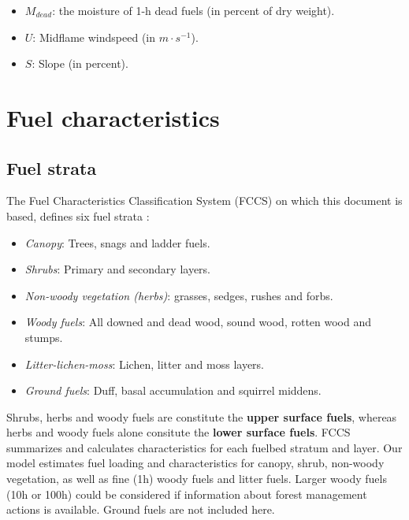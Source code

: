 \documentclass[]{book}
\providecommand{\tightlist}{%
  \setlength{\itemsep}{0pt}\setlength{\parskip}{0pt}}
\begin{document}
\begin{itemize}
\tightlist
\item
  \(M_{dead}\): the moisture of 1-h dead fuels (in percent of dry weight).
\item
  \(U\): Midflame windspeed (in \(m\cdot s^{-1}\)).
\item
  \(S\): Slope (in percent).
\end{itemize}

\hypertarget{fuel-characteristics}{%
\section{Fuel characteristics}\label{fuel-characteristics}}

\hypertarget{fuel-strata}{%
\subsection{Fuel strata}\label{fuel-strata}}

The Fuel Characteristics Classification System (FCCS) on which this document is based, defines six fuel strata \citep{Prichard2013}:

\begin{itemize}
\tightlist
\item
  \emph{Canopy}: Trees, snags and ladder fuels.
\item
  \emph{Shrubs}: Primary and secondary layers.
\item
  \emph{Non-woody vegetation (herbs)}: grasses, sedges, rushes and forbs.
\item
  \emph{Woody fuels}: All downed and dead wood, sound wood, rotten wood and stumps.
\item
  \emph{Litter-lichen-moss}: Lichen, litter and moss layers.
\item
  \emph{Ground fuels}: Duff, basal accumulation and squirrel middens.
\end{itemize}

Shrubs, herbs and woody fuels are constitute the \textbf{upper surface fuels}, whereas herbs and woody fuels alone consitute the \textbf{lower surface fuels}. FCCS summarizes and calculates characteristics for each fuelbed stratum and layer. Our model estimates fuel loading and characteristics for canopy, shrub, non-woody vegetation, as well as fine (1h) woody fuels and litter fuels. Larger woody fuels (10h or 100h) could be considered if information about forest management actions is available. Ground fuels are not included here.
\end{document}
